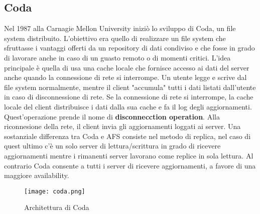\subsection{Coda}
Nel 1987 alla Carnagie Mellon University iniziò lo sviluppo di Coda, un file system distribuito. L'obiettivo era quello di realizzare un file system che sfruttasse i vantaggi offerti da un repository di dati condiviso e che fosse in grado di lavorare anche in caso di un guasto remoto o di momenti critici. L'idea principale è quella di usa una cache locale che fornisce accesso ai dati del server anche quando la connessione di rete si interrompe. Un utente legge e scrive dal file system normalmente, mentre il client "accumula" tutti i dati listati dall'utente in caso di disconnessione di rete.
Se la connessione di rete si interrompe, la cache locale del client distribuisce i dati dalla sua cache e fa il log degli aggiornamenti. Quest'operazione prende il nome di \textbf{disconnecction operation}. Alla riconnesione della rete, il client invia gli aggiornamenti loggati ai server. Una sostanziale differenza tra Coda e AFS consiste nel metodo di replica, nel caso di quest ultimo c'è un solo server di lettura/scrittura in grado di ricevere aggiornamenti mentre i rimanenti server lavorano come replice in sola lettura. Al contrario Coda consente a tutti i server di ricevere aggiornamenti, a favore di una maggiore availability.\cite{kistler92}
\begin{figure}[H]
  \begin{center}
    \texttt{[image: coda.png]}
    \caption{Architettura di Coda}
    \label{fg:code.png}
  \end{center}
\end{figure}
